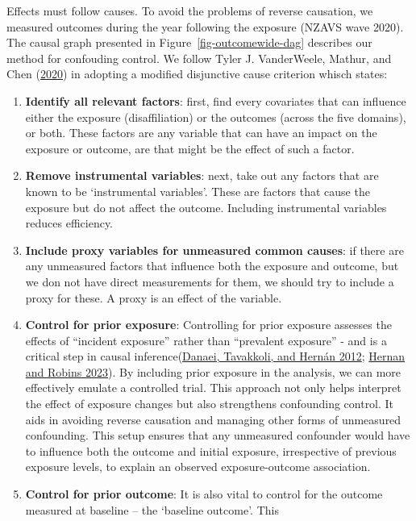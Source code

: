 \documentclass[
  singlecolumn]{report}
\begin{document}
Effects must follow causes. To avoid the problems of reverse causation,
we measured outcomes during the year following the exposure (NZAVS wave
2020). The causal graph presented in Figure~\ref{fig-outcomewide-dag}
describes our method for confouding control. We follow Tyler J.
VanderWeele, Mathur, and Chen
(\protect\hyperlink{ref-vanderweele2020}{2020}) in adopting a modified
disjunctive cause criterion whisch states:

\begin{enumerate}
\def\labelenumi{\arabic{enumi}.}
\item
  \textbf{Identify all relevant factors}: first, find every covariates
  that can influence either the exposure (disaffiliation) or the
  outcomes (across the five domains), or both. These factors are any
  variable that can have an impact on the exposure or outcome, are that
  might be the effect of such a factor.
\item
  \textbf{Remove instrumental variables}: next, take out any factors
  that are known to be `instrumental variables'. These are factors that
  cause the exposure but do not affect the outcome. Including
  instrumental variables reduces efficiency.
\item
  \textbf{Include proxy variables for unmeasured common causes}: if
  there are any unmeasured factors that influence both the exposure and
  outcome, but we don not have direct measurements for them, we should
  try to include a proxy for these. A proxy is an effect of the
  variable.
\item
  \textbf{Control for prior exposure}: Controlling for prior exposure
  assesses the effects of ``incident exposure'' rather than ``prevalent
  exposure'' - and is a critical step in causal
  inference(\protect\hyperlink{ref-danaei2012}{Danaei, Tavakkoli, and
  Hernán 2012}; \protect\hyperlink{ref-hernan2023}{Hernan and Robins
  2023}). By including prior exposure in the analysis, we can more
  effectively emulate a controlled trial. This approach not only helps
  interpret the effect of exposure changes but also strengthens
  confounding control. It aids in avoiding reverse causation and
  managing other forms of unmeasured confounding. This setup ensures
  that any unmeasured confounder would have to influence both the
  outcome and initial exposure, irrespective of previous exposure
  levels, to explain an observed exposure-outcome association.
\item
  \textbf{Control for prior outcome}: It is also vital to control for
  the outcome measured at baseline -- the `baseline outcome'. This

\end{enumerate}
\end{document}
